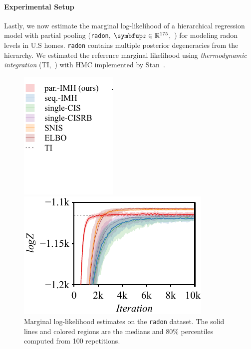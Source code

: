 \paragraph{Experimental Setup}
Lastly, we now estimate the marginal log-likelihood of a hierarchical regression model with partial pooling (\texttt{radon}, \(\vz \in \mathbb{R}^{175}\),~\citealt{gelman_data_2007}) for modeling radon levels in U.S homes.
\texttt{radon} contains multiple posterior degeneracies from the hierarchy.
We estimated the reference marginal likelihood using \textit{thermodynamic integration} (TI,~\citealt{gelman_simulating_1998, neal_annealed_2001, lartillot_computing_2006}) with HMC implemented by Stan~\citep{carpenter_stan_2017, betancourt_conceptual_2017}.
%
\begin{figure}[H]
  \vspace{-0.1in}
  \centering
  \begin{minipage}[b]{0.25\linewidth}
    \centering
    \includegraphics[scale=0.8]{figures/radon_03.pdf}
  \end{minipage}
  \begin{minipage}[b]{0.7\linewidth}
    \centering
    \includegraphics[scale=0.8]{figures/radon_02.pdf}
  \end{minipage}
    \vspace{-0.1in}
  \caption{Marginal log-likelihood estimates on the \texttt{radon} dataset.
    The solid lines and colored regions are the medians and 80\% percentiles computed from 100 repetitions.
  }\label{fig:marginal_likelihood}
  \vspace{-0.1in}
\end{figure}
%
  \vspace{-0.2in}
